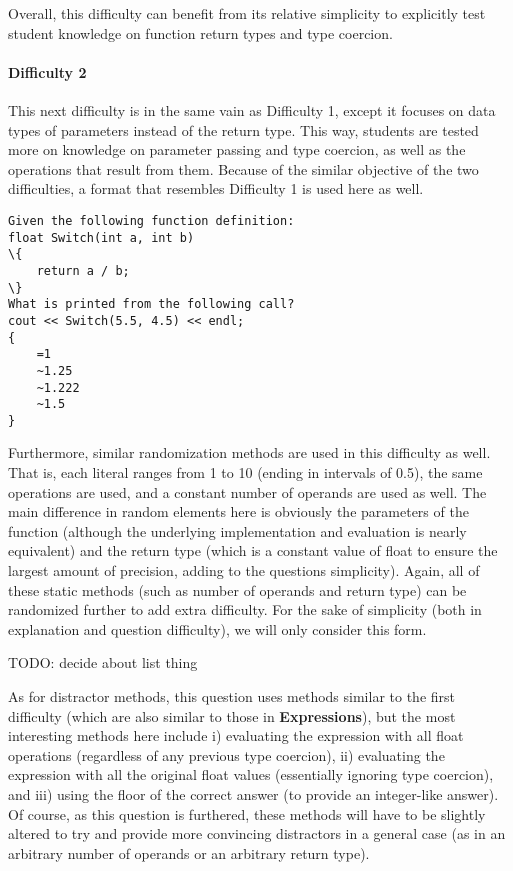 \documentclass{article}
\begin{document}
Overall, this difficulty can benefit from its relative simplicity to explicitly test student knowledge on function return types and type coercion.

\paragraph{Difficulty 2} \hfill \par

This next difficulty is in the same vain as Difficulty 1, except it focuses on data types of parameters instead of the return type. This way, students are tested more on knowledge on parameter passing and type coercion, as well as the operations that result from them.
Because of the similar objective of the two difficulties, a format that resembles Difficulty 1 is used here as well.

\begin{lstlisting}[caption={\textbf{Functions} Difficulty 2 GIFT Example}, label=lst-functions_2, float]
Given the following function definition:
float Switch(int a, int b)
\{
    return a / b;
\}
What is printed from the following call?
cout << Switch(5.5, 4.5) << endl;
{
	=1
	~1.25
	~1.222
	~1.5
}
\end{lstlisting}


Furthermore, similar randomization methods are used in this difficulty as well. That is, each literal ranges from 1 to 10 (ending in intervals of 0.5), the same operations are used, and a constant number of operands are used as well. The main difference in random elements here 
is obviously the parameters of the function (although the underlying implementation and evaluation is nearly equivalent) and the return type (which is a constant value of float to ensure the largest amount of precision, adding to the questions simplicity). Again, all of these static methods (such as number of operands and return type) can be randomized further to add extra difficulty. For the sake of simplicity (both in explanation and question difficulty), we will only consider this form.

TODO: decide about list thing

As for distractor methods, this question uses methods similar to the first difficulty (which are also similar to those in \textbf{Expressions}), but the most interesting methods here include i) evaluating the expression with all float operations (regardless of any previous type coercion), ii) evaluating the expression with all the original float values (essentially ignoring type coercion), and iii) using the floor of the correct answer (to provide an integer-like answer). Of course, as this question is furthered, these methods will have to be slightly altered to try and provide more convincing distractors in a general case (as in an arbitrary number of operands or an arbitrary return type).
\end{document}
